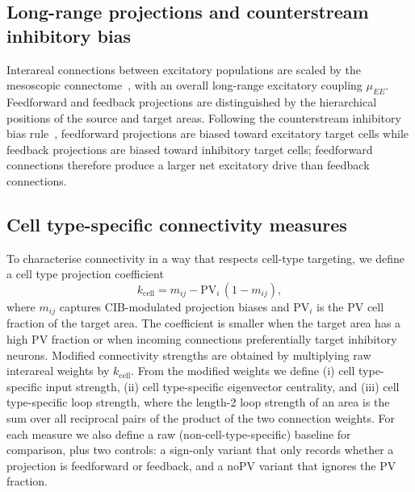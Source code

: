 \documentclass[11pt]{article}
\begin{document}
\subsection{Long-range projections and counterstream inhibitory bias}
Interareal connections between excitatory populations are scaled by the mesoscopic connectome~\cite{oh2014mesoscale,knox2018highresolution,harris2019hierarchical}, with an overall long-range excitatory coupling $\mu_{EE}$. Feedforward and feedback projections are distinguished by the hierarchical positions of the source and target areas. Following the counterstream inhibitory bias rule~\cite{mejias2022mechanisms,wang2020macroscopic}, feedforward projections are biased toward excitatory target cells while feedback projections are biased toward inhibitory target cells; feedforward connections therefore produce a larger net excitatory drive than feedback connections.

\subsection{Cell type-specific connectivity measures}
To characterise connectivity in a way that respects cell-type targeting, we define a cell type projection coefficient
\begin{equation}
  k_{\text{cell}} = m_{ij} - \mathrm{PV}_i \, (1 - m_{ij}),
\end{equation}
where $m_{ij}$ captures CIB-modulated projection biases and $\mathrm{PV}_i$ is the PV cell fraction of the target area. The coefficient is smaller when the target area has a high PV fraction or when incoming connections preferentially target inhibitory neurons. Modified connectivity strengths are obtained by multiplying raw interareal weights by $k_{\text{cell}}$. From the modified weights we define (i) cell type-specific input strength, (ii) cell type-specific eigenvector centrality, and (iii) cell type-specific loop strength, where the length-2 loop strength of an area is the sum over all reciprocal pairs of the product of the two connection weights. For each measure we also define a raw (non-cell-type-specific) baseline for comparison, plus two controls: a sign-only variant that only records whether a projection is feedforward or feedback, and a noPV variant that ignores the PV fraction.
\end{document}
